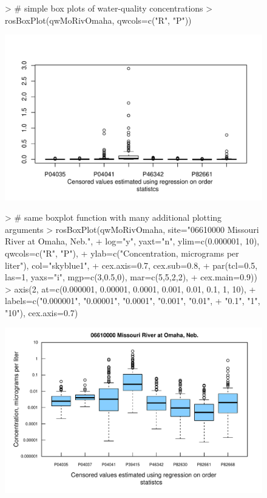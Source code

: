 \documentclass[11pt]{article}
\begin{document}
\begin{figure}[H]
\centering
\begin{Schunk}
\begin{Sinput}
> # simple box plots of water-quality concentrations
> rosBoxPlot(qwMoRivOmaha, qwcols=c("R", "P"))
\end{Sinput}
\end{Schunk}
\includegraphics{vignette-004}
\end{figure}

\begin{figure}[H]
\centering
\begin{Schunk}
\begin{Sinput}
> # same boxplot function with many additional plotting arguments
> rosBoxPlot(qwMoRivOmaha, site="06610000 Missouri River at Omaha, Neb.",
+                      log="y", yaxt="n", ylim=c(0.000001, 10), qwcols=c("R", "P"), 
+                      ylab=c("Concentration, micrograms per liter"), col="skyblue1",
+                      cex.axis=0.7, cex.sub=0.8, 
+                      par(tcl=0.5, las=1, yaxs="i", mgp=c(3,0.5,0), mar=c(5,5,2,2), 
+                      cex.main=0.9))
> axis(2, at=c(0.000001, 0.00001, 0.0001, 0.001, 0.01, 0.1, 1, 10),
+ labels=c("0.000001", "0.00001", "0.0001", "0.001", "0.01",
+ "0.1", "1", "10"), cex.axis=0.7)
\end{Sinput}
\end{Schunk}
\includegraphics{vignette-005}
\end{figure}
\end{document}
